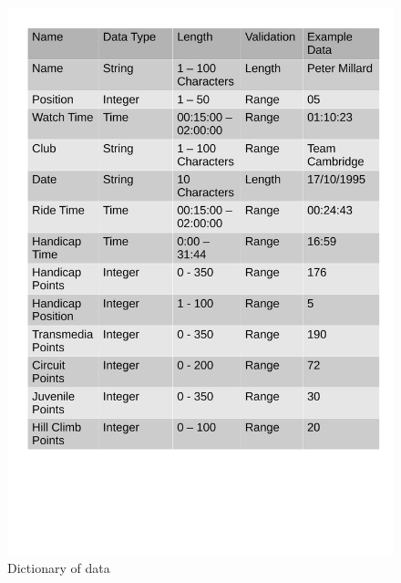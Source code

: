 \begin{figure}[H]
	\includegraphics[width=\textwidth]{./DataDic.pdf}
	\caption{Dictionary of data}
\end{figure}



